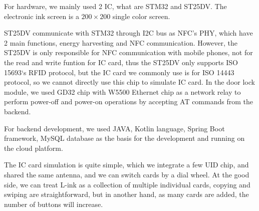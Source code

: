 \documentclass[11pt, a4paper]{article}
\begin{document}
For hardware, we mainly used 2 IC, what are STM32 and ST25DV. The electronic ink screen is a $200 \times 200$ single color screen.

ST25DV communicate with STM32 through I2C bus as NFC’s PHY, which have 2 main functions, energy harvesting and NFC communication. However, the ST25DV is only responsible for NFC communication with mobile phones, not for the read and write funtion for IC card, thus the ST25DV only supports ISO 15693‘s RFID protocol, but the IC card we commonly use is for ISO 14443 protocol, so we cannot directly use this chip to simulate IC card. In the door lock module, we used GD32 chip with W5500 Ethernet chip as a network relay to perform power-off and power-on operations by accepting AT commands from the backend.

For backend development, we used JAVA, Kotlin language, Spring Boot framework, MySQL database as the basis for the development and running on the cloud platform.

The IC card simulation is quite simple, which we integrate a few UID chip, and shared the same antenna, and we can switch cards by a dial wheel. At the good side, we can treat L-ink as a collection of multiple individual cards, copying and swiping are straightforward, but in another hand, as many cards are added, the number of buttons will increase.

\nocite{*}
\printbibliography
\end{document}
